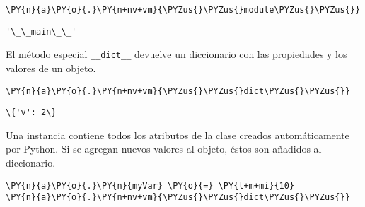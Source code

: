 \begin{tcolorbox}[breakable, size=fbox, boxrule=1pt, pad at break*=1mm,colback=cellbackground, colframe=cellborder]
\begin{Verbatim}[commandchars=\\\{\}]
\PY{n}{a}\PY{o}{.}\PY{n+nv+vm}{\PYZus{}\PYZus{}module\PYZus{}\PYZus{}}
\end{Verbatim}
\end{tcolorbox}

\begin{tcolorbox}[breakable, size=fbox, boxrule=.5pt, pad at break*=1mm, opacityfill=0]
\begin{Verbatim}[commandchars=\\\{\}]
'\_\_main\_\_'
\end{Verbatim}
\end{tcolorbox}
        
El método especial \texttt{\_\_dict\_\_} devuelve un diccionario con las
propiedades y los valores de un objeto.

\begin{tcolorbox}[breakable, size=fbox, boxrule=1pt, pad at break*=1mm,colback=cellbackground, colframe=cellborder]
\begin{Verbatim}[commandchars=\\\{\}]
\PY{n}{a}\PY{o}{.}\PY{n+nv+vm}{\PYZus{}\PYZus{}dict\PYZus{}\PYZus{}}
\end{Verbatim}
\end{tcolorbox}

\begin{tcolorbox}[breakable, size=fbox, boxrule=.5pt, pad at break*=1mm, opacityfill=0]
\begin{Verbatim}[commandchars=\\\{\}]
\{'v': 2\}
\end{Verbatim}
\end{tcolorbox}
        
Una instancia contiene todos los atributos de la clase creados
automáticamente por Python. Si se agregan nuevos valores al objeto,
éstos son añadidos al diccionario.

\begin{tcolorbox}[breakable, size=fbox, boxrule=1pt, pad at break*=1mm,colback=cellbackground, colframe=cellborder]
\begin{Verbatim}[commandchars=\\\{\}]
\PY{n}{a}\PY{o}{.}\PY{n}{myVar} \PY{o}{=} \PY{l+m+mi}{10}
\PY{n}{a}\PY{o}{.}\PY{n+nv+vm}{\PYZus{}\PYZus{}dict\PYZus{}\PYZus{}}
\end{Verbatim}
\end{tcolorbox}

